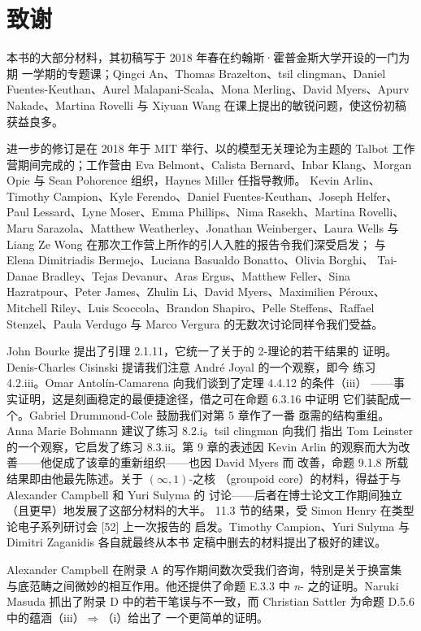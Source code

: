\section*{致谢}

本书的大部分材料，其初稿写于 2018 年春在约翰斯·霍普金斯大学开设的一门为期
一学期的专题课；Qingci An、Thomas Brazelton、tsil clingman、Daniel
Fuentes-Keuthan、Aurel Malapani-Scala、Mona Merling、David Myers、Apurv
Nakade、Martina Rovelli 与 Xiyuan Wang 在课上提出的敏锐问题，使这份初稿
获益良多。

进一步的修订是在 2018 年于 MIT 举行、以\trInfinityCategory{}的模型无关理论为主题的
Talbot 工作营期间完成的；工作营由 Eva Belmont、Calista Bernard、Inbar
Klang、Morgan Opie 与 Sean Pohorence 组织，Haynes Miller 任指导教师。
Kevin Arlin、Timothy Campion、Kyle Ferendo、Daniel Fuentes-Keuthan、Joseph
Helfer、Paul Lessard、Lyne Moser、Emma Phillips、Nima Rasekh、Martina
Rovelli、Maru Sarazola、Matthew Weatherley、Jonathan Weinberger、Laura
Wells 与 Liang Ze Wong 在那次工作营上所作的引人入胜的报告令我们深受启发；
与 Elena Dimitriadis Bermejo、Luciana Basualdo Bonatto、Olivia Borghi、
Tai-Danae Bradley、Tejas Devanur、Aras Ergus、Matthew Feller、Sina
Hazratpour、Peter James、Zhulin Li、David Myers、Maximilien Péroux、
Mitchell Riley、Luis Scoccola、Brandon Shapiro、Pelle Steffens、Raffael
Stenzel、Paula Verdugo 与 Marco Vergura 的无数次讨论同样令我们受益。

John Bourke 提出了引理 2.1.11，它统一了关于\trAdjunction{}的 2-\trCategory{}理论的若干结果的
证明。Denis-Charles Cisinski 提请我们注意 André Joyal 的一个观察，即今
练习 4.2.iii。Omar Antolín-Camarena 向我们谈到了定理 4.4.12 的条件（iii）
——事实证明，这是刻画稳定\trInfinityCategory{}的最便捷途径，借之可在命题 6.3.16 中证明
它们装配成一个\trInfinityCosmos{}。Gabriel Drummond-Cole 鼓励我们对第 5 章作了一番
亟需的结构重组。Anna Marie Bohmann 建议了练习 8.2.i。tsil clingman 向我们
指出 Tom Leinster 的一个观察，它启发了练习 8.3.ii。第 9 章的表述因 Kevin
Arlin 的观察而大为改善——他促成了该章的重新组织——也因 David Myers 而
改善，命题 9.1.8 所载结果即由他最先陈述。关于 $(\infty,1)$-\trCategory{}之\trGroupoid{}核
（groupoid core）的材料，得益于与 Alexander Campbell 和 Yuri Sulyma 的
讨论——后者在博士论文工作期间独立（且更早）地发展了这部分材料的大半。
11.3 节的结果，受 Simon Henry 在\trHomotopy{}类型论电子系列研讨会 [52] 上一次报告的
启发。Timothy Campion、Yuri Sulyma 与 Dimitri Zaganidis 各自就最终从本书
定稿中删去的材料提出了极好的建议。

Alexander Campbell 在附录 A 的写作期间数次受我们咨询，特别是关于换富集%
\trFunctor{}与底范畴之间微妙的相互作用。他还提供了命题 E.3.3 中 \emph{n}-\trQuasiCategory
之\trInfinityCosmos{}的证明。Naruki Masuda 抓出了附录 D 中的若干笔误与不一致，而
Christian Sattler 为命题 D.5.6 中的蕴涵（iii）$\Rightarrow$（i）给出了
一个更简单的证明。

